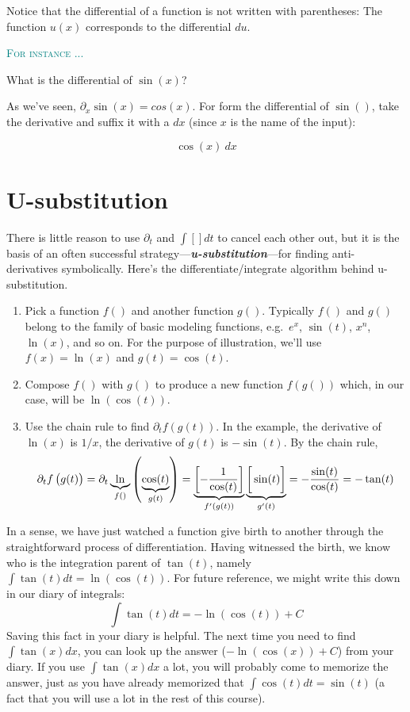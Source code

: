 \documentclass[
  letterpaper,
  DIV=11,
  numbers=noendperiod,
  oneside]{scrreprt}
\providecommand{\tightlist}{%
  \setlength{\itemsep}{0pt}\setlength{\parskip}{0pt}}
\newenvironment{example}%
{%
\textcolor{teal}{\hrulefill}%
  \par\vspace{.3\baselineskip}%
  \textcolor{teal}{\scshape For instance ...}%
  \par\vspace{\baselineskip}%
}%
{\textcolor{teal}{\hrulefill}}
\begin{document}
Notice that the differential of a function is not written with
parentheses: The function \(u(x)\) corresponds to the differential
\(du\).

\begin{example}
What is the differential of \(\sin(x)\)?

As we've seen, \(\partial_x \sin(x) = cos(x)\). For form the
differential of \(\sin()\), take the derivative and suffix it with a
\(dx\) (since \(x\) is the name of the input):

\[\cos(x)\ dx\]

\end{example}

\hypertarget{u-substitution}{%
\section{U-substitution}\label{u-substitution}}

There is little reason to use \(\partial_t\) and
\(\int \left[\right]dt\) to cancel each other out, but it is the basis
of an often successful strategy---\textbf{\emph{u-substitution}}---for
finding anti-derivatives symbolically. Here's the
differentiate/integrate algorithm behind u-substitution.

\begin{enumerate}
\def\labelenumi{\arabic{enumi}.}
\tightlist
\item
  Pick a function \(f()\) and another function \(g()\). Typically
  \(f()\) and \(g()\) belong to the family of basic modeling functions,
  e.g.~\(e^x\), \(\sin(t)\), \(x^n\), \(\ln(x)\), and so on. For the
  purpose of illustration, we'll use \(f(x) = \ln(x)\) and
  \(g(t) = \cos(t)\).
\item
  Compose \(f()\) with \(g()\) to produce a new function \(f(g())\)
  which, in our case, will be \(\ln(\cos(t))\).
\item
  Use the chain rule to find \(\partial_t f(g(t))\). In the example, the
  derivative of \(\ln(x)\) is \(1/x\), the derivative of \(g(t)\) is
  \(-\sin(t)\). By the chain rule,
  \[\partial_t f\left(\strut g(t)\right) = \partial_t \underbrace{\Large\ln}_{f()}\left(\underbrace{\large\cos(t)}_{g(t)}\right) = \underbrace{\left[- \frac{1}{\cos(t)}\right]}_{f'(g(t))} \underbrace{\left[{\LARGE\strut}\sin(t)\right]}_{g'(t)} = -  \frac{\sin(t)}{\cos(t)} = - \tan(t)\]
\end{enumerate}

In a sense, we have just watched a function give birth to another
through the straightforward process of differentiation. Having witnessed
the birth, we know who is the integration parent of \(\tan(t)\), namely
\(\int \tan(t) dt = \ln\left(\cos(t)\right)\). For future reference, we
might write this down in our diary of integrals:
\[\int \tan(t) dt = - \ln(\cos(t)) + C\] Saving this fact in your diary
is helpful. The next time you need to find \(\int \tan(x) dx\), you can
look up the answer (\(-\ln(\cos(x)) + C\)) from your diary. If you use
\(\int \tan(x) dx\) a lot, you will probably come to memorize the
answer, just as you have already memorized that
\(\int \cos(t) dt = \sin(t)\) (a fact that you will use a lot in the
rest of this course).
\end{document}
